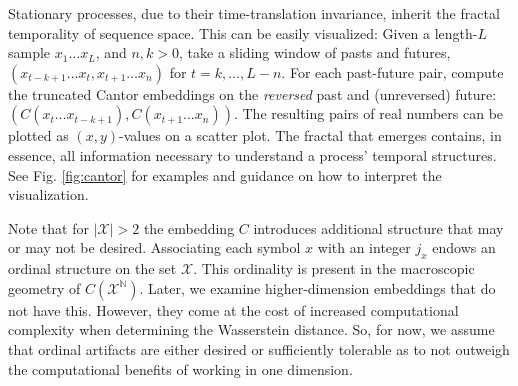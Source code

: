 \documentclass[draft,aps,pre,twocolumn,groupaddress,showkeys,nofootinbib,preprintnumbers,floatfix]{revtex4-2}
\begin{document}
Stationary processes, due to their time-translation invariance, inherit the
fractal temporality of sequence space. This can be easily visualized: Given a
length-$L$ sample $x_1\dots x_L$, and $n,k>0$, take a sliding window of pasts
and futures, $(x_{t-k+1}\dots x_t, x_{t+1}\dots x_n)$ for $t=k,\dots,L-n$.  For
each past-future pair, compute the truncated Cantor embeddings on the
\emph{reversed} past and (unreversed) future: $\left(C(x_t \dots
x_{t-k+1}),C(x_{t+1}\dots x_n)\right)$. The resulting pairs of real numbers can
be plotted as $(x,y)$-values on a scatter plot. The fractal that emerges
contains, in essence, all information necessary to understand a process'
temporal structures. See Fig. \ref{fig:cantor} for examples and guidance on how
to interpret the visualization.

Note that for $|\mathcal{X}|>2$ the embedding $C$ introduces additional
structure that may or may not be desired. Associating each symbol $x$ with an
integer $j_x$ endows an ordinal structure on the set $\mathcal{X}$. This
ordinality is present in the macroscopic geometry of
$C\left(\mathcal{X}^{\mathbb{N}}\right)$. Later, we examine higher-dimension
embeddings that do not have this. However, they come at the cost of increased
computational complexity when determining the Wasserstein distance. So, for now,
we assume that ordinal artifacts are either desired or sufficiently tolerable
as to not outweigh the computational benefits of working in one dimension.
\end{document}
